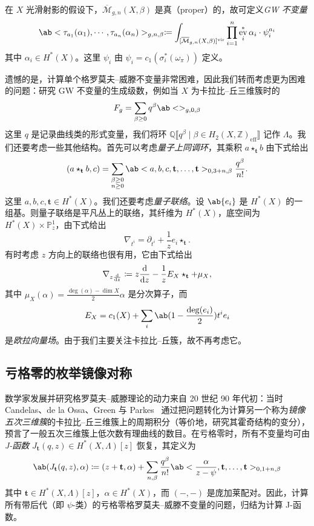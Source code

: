 \documentclass{amsart}
\theoremstyle{definition}
\theoremstyle{remark}
\theoremstyle{plain}
\theoremstyle{definition}
\theoremstyle{remark}
\newcommand{\Z}{\mathbb{Z}}
\newcommand{\Q}{\mathbb{Q}}
\renewcommand{\P}{\mathbb{P}}
\newcommand{\Mbar}{\overline{\mathcal{M}}}
\newcommand{\mbf}[1]{\mathbf{#1}}
\newcommand{\mr}[1]{\mathrm{#1}}
\newcommand{\1}{\mathbf{1}}
\newcommand{\2}{\mathbf{2}}
\newcommand{\3}{\mathbf{3}}
\newcommand{\vir}{\mr{vir}}
\newcommand{\ps}[1]{\llbracket #1 \rrbracket}
\DeclareMathOperator{\ev}{ev}
\begin{document}
在 \(X\) 光滑射影的假设下，\(\Mbar_{g,n}(X, \beta)\) 是真（proper）的，故可定义\textit{GW 不变量}
\[ \ab<\tau_{a_1}(\alpha_1), \cdots, \tau_{a_n}(\alpha_n)>_{g,n,\beta} \coloneqq \int_{[\Mbar_{g,n}(X, \beta)]^{\vir}} \prod_{i=1}^n \ev_i^* \alpha_i \cdot \psi_i^{a_i} \]
其中 \(\alpha_i \in H^*(X)\)。这里 \(\psi_i\) 由 \(\psi_i = c_1(\sigma_i^*(\omega_{\pi}))\) 定义。

遗憾的是，计算单个格罗莫夫–威滕不变量非常困难，因此我们转而考虑更为困难的问题：研究 GW 不变量的生成级数，例如当 \(X\) 为卡拉比–丘三维簇时的
\[ F_g = \sum_{\beta \geq 0} q^{\beta} \ab<>_{g,0,\beta} \]
这里 \(q\) 是记录曲线类的形式变量，我们将环 \(\Q\ps{q^{\beta} \mid \beta \in H_2(X, \Z)_{\mr{eff}}}\) 记作 \(\Lambda\)。我们还要考虑一些其他结构。首先可以考虑\textit{量子上同调环}，其乘积 \(a \star_{\mbf{t}} b\) 由下式给出
\[
    (a \star_{\mbf{t}} b, c) = \sum_{\substack{\beta \geq 0 \\ n \geq 0}} \ab<a,b,c, \mbf{t}, \ldots, \mbf{t}>_{0,3+n,\beta} \frac{q^{\beta}}{n!}.
\]
这里 \(a,b,c, \mbf{t} \in H^*(X)\)。我们还要考虑\textit{量子联络}。设 \(\ab\{ e_i \}\) 是 \(H^*(X)\) 的一组基。则量子联络是平凡丛上的联络，其纤维为 \(H^*(X)\)，底空间为 \(H^*(X) \times \P^1_z\)，由下式给出
\[ \nabla_{t^i} = \partial_{t^i} + \frac{1}{z} e_i \star_{\mbf{t}}. \]
有时考虑 \(z\) 方向上的联络也很有用，它由下式给出
\[ \nabla_{z \odv{}{z}} \coloneqq z \odv{}{z} - \frac{1}{z} E_X \star_{\mbf{t}} + \mu_X, \]
其中 \(\mu_X(\alpha) = \frac{\deg(\alpha) - \dim X}{2} \alpha\) 是分次算子，而
\[ E_X = c_1(X) + \sum_i \ab(1 - \frac{\deg(e_i)}{2})t^i e_i \]
是\textit{欧拉向量场}。由于我们主要关注卡拉比–丘簇，故不再考虑它。

\subsection{亏格零的枚举镜像对称}%
\label{sub:Enumerative mirror symmetry in genus zero}

数学家发展并研究格罗莫夫–威滕理论的动力来自 20 世纪 90 年代初：当时 Candelas、de la Ossa、Green 与 Parkes~\cite{CandelasEtAl1991} 通过把问题转化为计算另一个称为\textit{镜像五次三维簇}的卡拉比–丘三维簇上的周期积分（等价地，研究其霍奇结构的变分），预言了一般五次三维簇上低次数有理曲线的数目。在亏格零时，所有不变量均可由\textit{J-函数} \(J_{\mbf{t}}(q,z) \in H^*(X, \Lambda)[z]\) 恢复，其定义为
\[ \ab( J_{\mbf{t}}(q, z), \alpha ) \coloneqq (z + \mbf{t}, \alpha) + \sum_{n, \beta} \frac{q^{\beta}}{n!} \ab< \frac{\alpha}{z-\psi}, \mbf{t}, \ldots, \mbf{t}>_{0,1+n, \beta} \]
其中 \(\mbf{t} \in H^*(X, \Lambda)[z]\)，\(\alpha \in H^*(X)\)，而 \((-,-)\) 是庞加莱配对。因此，计算所有带后代（即 \(\psi\)-类）的亏格零格罗莫夫–威滕不变量的问题，归结为计算 J-函数。
\end{document}
